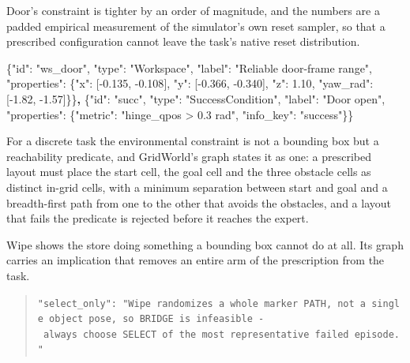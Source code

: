 \documentclass[
  11pt,
]{article}
\newenvironment{Shaded}{}{}
\newcommand{\DataTypeTok}[1]{\textcolor[rgb]{0.56,0.13,0.00}{#1}}
\newcommand{\ErrorTok}[1]{\textcolor[rgb]{1.00,0.00,0.00}{\textbf{#1}}}
\newcommand{\FloatTok}[1]{\textcolor[rgb]{0.25,0.63,0.44}{#1}}
\newcommand{\FunctionTok}[1]{\textcolor[rgb]{0.02,0.16,0.49}{#1}}
\newcommand{\OtherTok}[1]{\textcolor[rgb]{0.00,0.44,0.13}{#1}}
\newcommand{\StringTok}[1]{\textcolor[rgb]{0.25,0.44,0.63}{#1}}
\begin{document}
Door's constraint is tighter by an order of magnitude, and the numbers
are a padded empirical measurement of the simulator's own reset sampler,
so that a prescribed configuration cannot leave the task's native reset
distribution.

\begin{Shaded}
\begin{Highlighting}[]
\FunctionTok{\{}\DataTypeTok{"id"}\FunctionTok{:} \StringTok{"ws\_door"}\FunctionTok{,} \DataTypeTok{"type"}\FunctionTok{:} \StringTok{"Workspace"}\FunctionTok{,} \DataTypeTok{"label"}\FunctionTok{:} \StringTok{"Reliable door{-}frame range"}\FunctionTok{,}
 \DataTypeTok{"properties"}\FunctionTok{:} \FunctionTok{\{}\DataTypeTok{"x"}\FunctionTok{:} \OtherTok{[}\FloatTok{{-}0.135}\OtherTok{,} \FloatTok{{-}0.108}\OtherTok{]}\FunctionTok{,} \DataTypeTok{"y"}\FunctionTok{:} \OtherTok{[}\FloatTok{{-}0.366}\OtherTok{,} \FloatTok{{-}0.340}\OtherTok{]}\FunctionTok{,} \DataTypeTok{"z"}\FunctionTok{:} \FloatTok{1.10}\FunctionTok{,}
                \DataTypeTok{"yaw\_rad"}\FunctionTok{:} \OtherTok{[}\FloatTok{{-}1.82}\OtherTok{,} \FloatTok{{-}1.57}\OtherTok{]}\FunctionTok{\}\}}\ErrorTok{,}
\FunctionTok{\{}\DataTypeTok{"id"}\FunctionTok{:} \StringTok{"succ"}\FunctionTok{,} \DataTypeTok{"type"}\FunctionTok{:} \StringTok{"SuccessCondition"}\FunctionTok{,} \DataTypeTok{"label"}\FunctionTok{:} \StringTok{"Door open"}\FunctionTok{,}
 \DataTypeTok{"properties"}\FunctionTok{:} \FunctionTok{\{}\DataTypeTok{"metric"}\FunctionTok{:} \StringTok{"hinge\_qpos \textgreater{} 0.3 rad"}\FunctionTok{,} \DataTypeTok{"info\_key"}\FunctionTok{:} \StringTok{"success"}\FunctionTok{\}\}}
\end{Highlighting}
\end{Shaded}

For a discrete task the environmental constraint is not a bounding box
but a reachability predicate, and GridWorld's graph states it as one: a
prescribed layout must place the start cell, the goal cell and the three
obstacle cells as distinct in-grid cells, with a minimum separation
between start and goal and a breadth-first path from one to the other
that avoids the obstacles, and a layout that fails the predicate is
rejected before it reaches the expert.

Wipe shows the store doing something a bounding box cannot do at all.
Its graph carries an implication that removes an entire arm of the
prescription from the task.

\begin{quote}
\texttt{"select\_only":\ "Wipe\ randomizes\ a\ whole\ marker\ PATH,\ not\ a\ single\ object\ pose,\ so\ BRIDGE\ is\ infeasible\ -\ always\ choose\ SELECT\ of\ the\ most\ representative\ failed\ episode."}
\end{quote}
\end{document}
